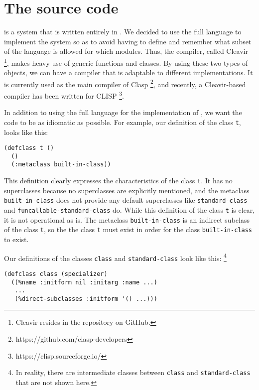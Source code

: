 \section{The \sicl{} source code}

\sicl{} is a system that is written entirely in \commonlisp{}.  We
decided to use the full language to implement the system so as to
avoid having to define and remember what subset of the language is
allowed for which modules.  Thus, the compiler, called Cleavir%
\footnote{Cleavir resides in the \sicl{} repository on GitHub.},
makes heavy use of generic functions and classes.  By using these two
types of objects, we can have a compiler that is adaptable to
different \commonlisp{} implementations.  It is currently used as the
main compiler of Clasp%
\footnote{https://github.com/clasp-developers},
and recently, a Cleavir-based compiler has
been written for CLISP%
\footnote{https://clisp.sourceforge.io/}.

In addition to using the full language for the implementation of
\sicl{}, we want the code to be as idiomatic as possible.  For
example, our definition of the class \texttt{t}, looks like this:

\begin{verbatim}
(defclass t ()
  ()
  (:metaclass built-in-class))
\end{verbatim}

\noindent
This definition clearly expresses the characteristics of the class
\texttt{t}.  It has no superclasses because no superclasses are
explicitly mentioned, and the metaclass \texttt{built-in-class} does
not provide any default superclasses like \texttt{standard-class} and
\texttt{funcallable-standard-class} do.  While this definition of the
class \texttt{t} is clear, it is not operational as is.  The
metaclass \texttt{built-in-class} is an indirect subclass of the class
\texttt{t}, so the the class \texttt{t} must exist in order for the
class \texttt{built-in-class} to exist.

Our definitions of the classes \texttt{class} and
\texttt{standard-class} look like this:%
\footnote{In reality, there are intermediate classes between
  \texttt{class} and \texttt{standard-class} that are not shown here.}

\begin{verbatim}
(defclass class (specializer)
  ((%name :initform nil :initarg :name ...)
   ...
   (%direct-subclasses :initform '() ...)))
\end{verbatim}

